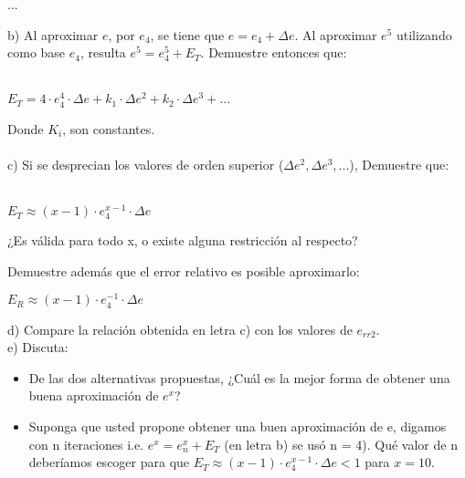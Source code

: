 \documentclass[]{article}
\begin{document}
...

b) Al aproximar $e$, por $e_{4}$, se tiene que $e = e_{4} + \Delta e$. Al aproximar $e^{5}$ utilizando como base $e_{4}$, resulta $e^{5} = e_{4}^5 + E_{T}$. Demuestre entonces que:
\\\\
\begin{center} $E_{T} = 4 \cdot e_{4}^4 \cdot \Delta e + k_{1} \cdot \Delta {e}^2 + k_{2} \cdot \Delta e^{3} + ...$ \end{center} 

Donde $K_{i}$, son constantes. \\\\

c) Si se desprecian los valores de orden superior ($\Delta e^{2}, \Delta e^{3}, ...$), Demuestre que: \\\\
\begin{center} $E_{T} \approx (x-1) \cdot e_{4}^{x-1}\cdot \Delta e$ \end{center}

¿Es válida para todo x, o existe alguna restricción al respecto?

Demuestre además que el error relativo es posible aproximarlo:
\begin{center} $E_{R} \approx (x-1) \cdot e_{4}^{-1}\cdot \Delta e$ \end{center}
d) Compare la relación obtenida en letra c) con los valores de $e_{rr2}$. \\

e) Discuta:

\begin{itemize}
	\item De las dos alternativas propuestas, ¿Cuál es la mejor forma de obtener una buena aproximación de $e^{x}$?

	\item Suponga que usted propone obtener una buen aproximación de e, digamos con n iteraciones i.e. $e^{x} = e_{n}^{x} + E_{T}$ (en letra b) se usó n = 4). Qué valor de n deberíamos escoger para que $E_{T} \approx (x-1) \cdot e_{4}^{x-1} \cdot \Delta e < 1$ para $x = 10$. \\
	
\end{itemize}


\section{}
\end{document}

